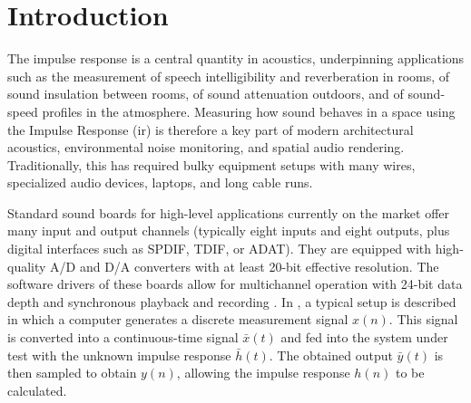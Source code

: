 \chapter{Introduction}\label{chap:intro}





The impulse response is a central quantity in acoustics, underpinning applications such as the measurement of speech intelligibility and reverberation in rooms, of sound insulation between rooms, of sound attenuation outdoors, and of sound-speed profiles in the atmosphere. Measuring how sound behaves in a space using the Impulse Response (\acrshort{ir}) is therefore a key part of modern architectural acoustics, environmental noise monitoring, and spatial audio rendering. Traditionally, this has required bulky equipment setups with many wires, specialized audio devices, laptops, and long cable runs.

Standard sound boards for high-level applications currently on the market offer many input and output channels (typically eight inputs and eight outputs, plus digital interfaces such as SPDIF, TDIF, or ADAT). They are equipped with high-quality A/D and D/A converters with at least 20-bit effective resolution. The software drivers of these boards allow for multichannel operation with 24-bit data depth and synchronous playback and recording \cite{farina2000SimMeasIR}. In \cite{holter2009IRRMeas}, a typical setup is described in which a computer generates a discrete measurement signal $x(n)$. This signal is converted into a continuous-time signal $\bar{x}(t)$ and fed into the system under test with the
unknown impulse response $\bar{h}(t)$. The obtained output $\bar{y}(t)$ is then sampled to obtain $y(n)$, allowing the impulse response $h(n)$ to be calculated.

